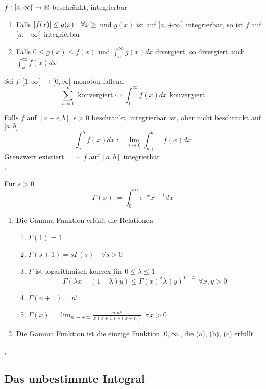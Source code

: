 \Korollar[5.8.2] $f: [a, \infty[ \ \rightarrow \mathbb{R}$ beschränkt, integrierbar
\begin{enumerate}
\item Falls $\left\lvert f(x) \right\rvert \leq g(x) \quad \forall x \geq$ und $g(x)$ ist auf $[a, +\infty[ \ $ integrierbar, so ist $f$ auf $[a, +\infty[ \ $ integrierbar
\item Falls $0 \leq g(x) \leq f(x)$ und $\int_a^\infty g(x) dx$ divergiert, so divergiert auch $\int_a^\infty f(x) dx$
\end{enumerate}

\Satz[5.8.5] Sei $f : [1, \infty[ \ \rightarrow [0, \infty [$ monoton fallend
\[ \sum_{n=1}^\infty \text{ konvergiert} \Longleftrightarrow \int_1^\infty f(x) dx \text{ konvergiert}  \]

\Def[5.8.8] Falls $f$ auf $[a+\epsilon,b], \epsilon>0$ beschränkt, integrierbar ist, aber nicht beschränkt auf $]a,b]$
\[ \int_a^b f(x) dx := \lim_{\epsilon \rightarrow 0} \int_{a+\epsilon}^b f(x) dx \]
Grenzwert existiert $\implies$  $f$ auf $[a, b]$ integrierbar \\

\sep

 Für $s > 0$
\[ \Gamma(x) := \int_0^\infty e^{-x} x^{s - 1} dx \]

\Satz[5.8.12]
\begin{enumerate}
\item Die Gamma Funktion erfüllt die Relationen
\begin{enumerate}
\item $\Gamma(1) = 1$
\item $\Gamma(s + 1) = s \Gamma(s) \quad\forall s > 0 $
\item $\Gamma$ ist logarithmisch konvex für $0 \leq \lambda \leq 1$
\[ \Gamma(\lambda x + (1 - \lambda) y) \leq \Gamma(x)^\lambda \lambda(y)^{1-\lambda} \ \  \forall x, y > 0\]
\item $\Gamma(n + 1) = n!$
\item $\Gamma(x)=\lim _{n \rightarrow+\infty} \frac{n ! n^{x}}{x(x+1) \cdots(x+n)} \ \ \forall x>0$

\end{enumerate}
\item Die Gamma Funktion ist die einzige Funktion $] 0 , \infty [ $, die (a), (b), (c) erfüllt
\end{enumerate}

\sep

\subsection{Das unbestimmte Integral}

